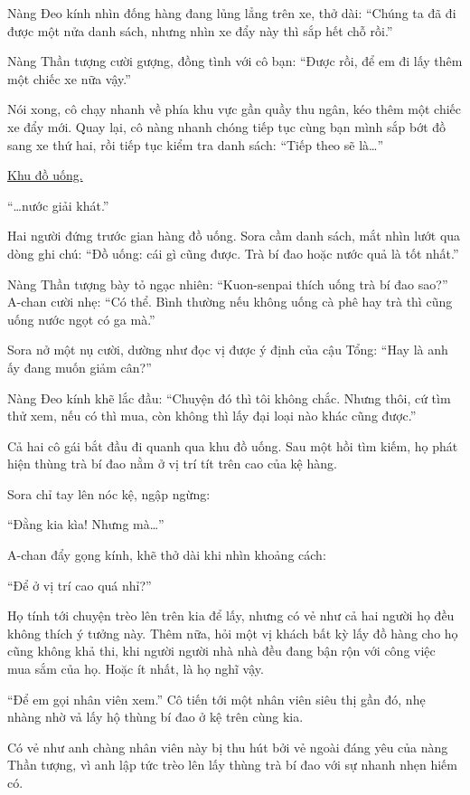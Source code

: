 \documentclass[../main.tex]{subfiles}
\begin{document}
Nàng Đeo kính nhìn đống hàng đang lủng lẳng trên xe, thở dài: ``Chúng ta đã đi được một nửa danh sách, nhưng nhìn xe đẩy này thì sắp hết chỗ rồi.''

Nàng Thần tượng cười gượng, đồng tình với cô bạn: ``Được rồi, để em đi lấy thêm một chiếc xe nữa vậy.''

Nói xong, cô chạy nhanh về phía khu vực gần quầy thu ngân, kéo thêm một chiếc xe đẩy mới. Quay lại, cô nàng nhanh chóng tiếp tục cùng bạn mình sắp bớt đồ sang xe thứ hai, rồi tiếp tục kiểm tra danh sách: ``Tiếp theo sẽ là\dots''

\begin{center}
    \uline{Khu đồ uống.}
\end{center}

``\dots nước giải khát.''

Hai người đứng trước gian hàng đồ uống. Sora cầm danh sách, mắt nhìn lướt qua dòng ghi chú: ``Đồ uống: cái gì cũng được. Trà bí đao hoặc nước quả là tốt nhất.''

Nàng Thần tượng bày tỏ ngạc nhiên: ``Kuon-senpai thích uống trà bí đao sao?'' A-chan cười nhẹ: ``Có thể. Bình thường nếu không uống cà phê hay trà thì cũng uống nước ngọt có ga mà.''

Sora nở một nụ cười, dường như đọc vị được ý định của cậu Tổng: ``Hay là anh ấy đang muốn giảm cân?''

Nàng Đeo kính khẽ lắc đầu: ``Chuyện đó thì tôi không chắc. Nhưng thôi, cứ tìm thử xem, nếu có thì mua, còn không thì lấy đại loại nào khác cũng được.''

Cả hai cô gái bắt đầu đi quanh qua khu đồ uống. Sau một hồi tìm kiếm, họ phát hiện thùng trà bí đao nằm ở vị trí tít trên cao của kệ hàng.

Sora chỉ tay lên nóc kệ, ngập ngừng:

``Đằng kia kìa! Nhưng mà\dots''

A-chan đẩy gọng kính, khẽ thở dài khi nhìn khoảng cách:

``Để ở vị trí cao quá nhỉ?''

Họ tính tới chuyện trèo lên trên kia để lấy, nhưng có vẻ như cả hai người họ đều không thích ý tưởng này. Thêm nữa, hỏi một vị khách bất kỳ lấy đồ hàng cho họ cũng không khả thi, khi người người nhà nhà đều đang bận rộn với công việc mua sắm của họ. Hoặc ít nhất, là họ nghĩ vậy.

``Để em gọi nhân viên xem.'' Cô tiến tới một nhân viên siêu thị gần đó, nhẹ nhàng nhờ vả lấy hộ thùng bí đao ở kệ trên cùng kia.

Có vẻ như anh chàng nhân viên này bị thu hút bởi vẻ ngoài đáng yêu của nàng Thần tượng, vì anh lập tức trèo lên lấy thùng trà bí đao với sự nhanh nhẹn hiếm có.
\end{document}

